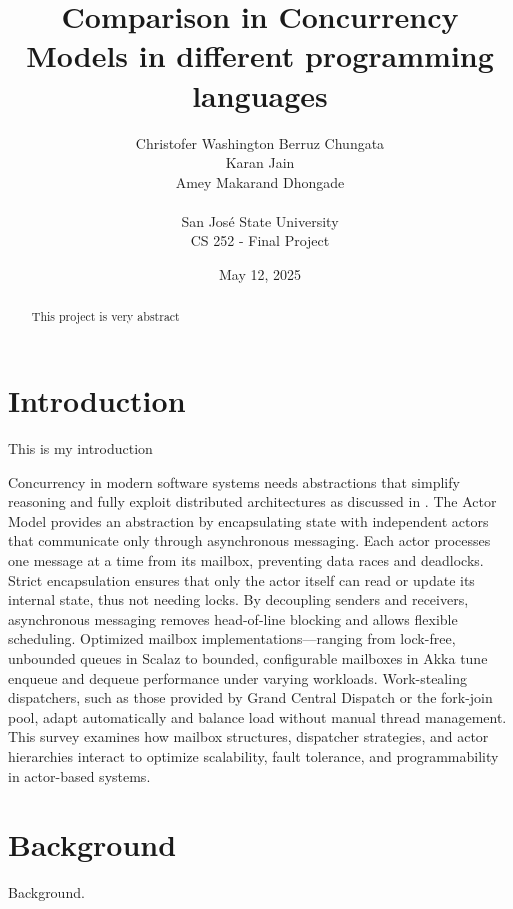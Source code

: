 \documentclass[12pt]{article}
\begin{document}
\title{Comparison in Concurrency Models in different programming languages}
\author{
    Christofer Washington Berruz Chungata \\ 
    Karan Jain \\ 
    Amey Makarand Dhongade \\ 
    \\
    San Jos\'{e} State University \\ 
    CS 252 - Final Project
}
\date{May 12, 2025}

\maketitle

\begin{abstract}
This project is very abstract
\end{abstract}

\section{Introduction\label{sec:introduction}}
This is my introduction

Concurrency in modern software systems needs abstractions that simplify reasoning and fully exploit distributed architectures as discussed in \cite{10.1145/357980.358021} . The Actor Model provides an abstraction by encapsulating state with independent actors that communicate only through asynchronous messaging. Each actor processes one message at a time from its mailbox, preventing data races and deadlocks. Strict encapsulation ensures that only the actor itself can read or update its internal state, thus not  needing locks. By decoupling senders and receivers, asynchronous messaging removes head-of-line blocking and allows flexible scheduling. Optimized mailbox implementations—ranging from lock-free, unbounded queues in Scalaz to bounded, configurable mailboxes in Akka tune enqueue and dequeue performance under varying workloads. Work-stealing dispatchers, such as those provided by Grand Central Dispatch or the fork-join pool, adapt automatically and balance load without manual thread management. This survey examines how mailbox structures, dispatcher strategies, and actor hierarchies interact to optimize scalability, fault tolerance, and programmability in actor-based systems.

\section{Background\label{sec:background}}
Background.







\end{document}
